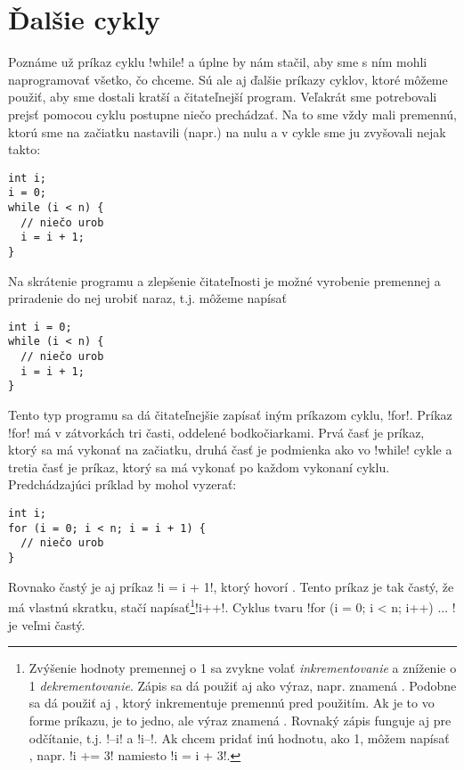 \chapter{Ďalšie cykly}

Poznáme už príkaz cyklu \prg!while! a úplne by nám stačil, aby sme s ním mohli 
naprogramovať všetko, čo chceme. Sú ale aj ďalšie príkazy cyklov, ktoré môžeme
použiť, aby sme dostali kratší a čitateľnejší program. Veľakrát sme potrebovali
prejsť pomocou cyklu postupne niečo prechádzať. Na to sme vždy mali premennú,
ktorú sme na začiatku nastavili (napr.) na nulu
a v cykle sme ju zvyšovali nejak takto:\\

\begin{lstlisting}
int i;
i = 0;
while (i < n) {
  // niečo urob
  i = i + 1;
}
\end{lstlisting}

Na skrátenie programu a zlepšenie čitateľnosti je možné vyrobenie premennej
a priradenie do nej urobiť naraz, t.j. môžeme napísať\\

\begin{lstlisting} 
int i = 0;
while (i < n) {
  // niečo urob
  i = i + 1;
}
\end{lstlisting}

Tento typ programu sa dá čitateľnejšie zapísať iným príkazom cyklu, \prg!for!.
Príkaz \prg!for! má v zátvorkách tri časti, oddelené bodkočiarkami. Prvá časť
je príkaz, ktorý sa má vykonať na začiatku, druhá časť je podmienka ako vo \prg!while!
cykle a tretia časť je príkaz, ktorý sa má vykonať po každom vykonaní cyklu.
Predchádzajúci príklad by mohol vyzerať:\\

\begin{lstlisting}
int i;
for (i = 0; i < n; i = i + 1) {
  // niečo urob
}
\end{lstlisting}


Rovnako častý je aj príkaz \prg!i = i + 1!, ktorý hovorí . Tento príkaz je tak
častý, že má vlastnú skratku, stačí napísať\footnote{
  Zvýšenie hodnoty premennej o 1 sa zvykne volať {\em inkrementovanie} a zníženie
  o 1 {\em dekrementovanie}.
  Zápis  sa dá použiť
  aj ako výraz, napr.  znamená .
  Podobne sa dá použiť aj , ktorý inkrementuje premennú pred použitím. 
  Ak je to vo forme príkazu, je to jedno, ale výraz \hbox{} znamená
  .
  Rovnaký zápis funguje aj pre odčítanie, t.j. \prg!--i! a \prg!i--!.
  Ak chcem pridať inú hodnotu, ako 1, môžem napísať \vb{+=}, napr. \prg!i += 3! namiesto
  \prg!i = i + 3!.
}\prg!i++!. Cyklus tvaru
\prg!for (i = 0; i < n; i++) { ... }! 
je veľmi častý. 

